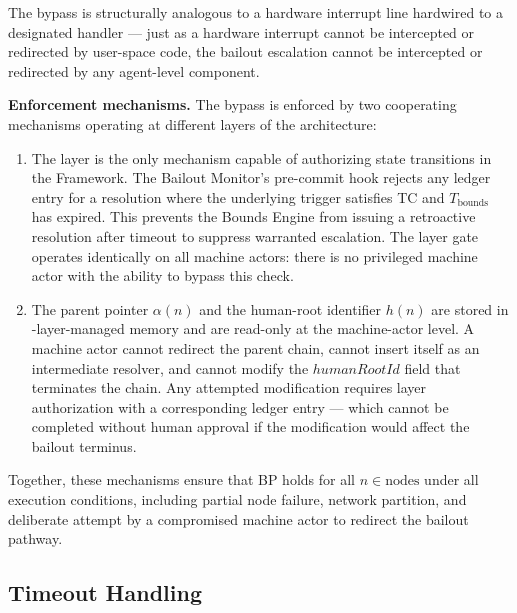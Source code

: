 The bypass is structurally analogous to a hardware interrupt line hardwired to a designated handler — just as a hardware interrupt cannot be intercepted or redirected by user-space code, the bailout escalation cannot be intercepted or redirected by any agent-level component.

\bigskip
\noindent\textbf{Enforcement mechanisms.} The bypass is enforced by two cooperating mechanisms operating at different layers of the \bxthree{} architecture:

\begin{enumerate}
\item[\textbf{Fact Layer gate (enforcement at the authorization layer).}] The \fact{} layer is the only mechanism capable of authorizing state transitions in the \bxthree{} Framework. The Bailout Monitor's pre-commit hook rejects any ledger entry for a resolution where the underlying trigger satisfies TC and $T_{\text{bounds}}$ has expired. This prevents the Bounds Engine from issuing a retroactive resolution after timeout to suppress warranted escalation. The \fact{} layer gate operates identically on all machine actors: there is no privileged machine actor with the ability to bypass this check.

\item[\textbf{Immutable parent-pointer and human-root architecture (enforcement at the data model layer).}] The parent pointer $\alpha(n)$ and the human-root identifier $h(n)$ are stored in \fact-layer-managed memory and are read-only at the machine-actor level. A machine actor cannot redirect the parent chain, cannot insert itself as an intermediate resolver, and cannot modify the $humanRootId$ field that terminates the chain. Any attempted modification requires \purpose{} layer authorization with a corresponding ledger entry — which cannot be completed without human approval if the modification would affect the bailout terminus.
\end{enumerate}

Together, these mechanisms ensure that BP holds for all $n \in \text{nodes}$ under all execution conditions, including partial node failure, network partition, and deliberate attempt by a compromised machine actor to redirect the bailout pathway.

\subsection{Timeout Handling}
\label{sec:timeout-handling}

